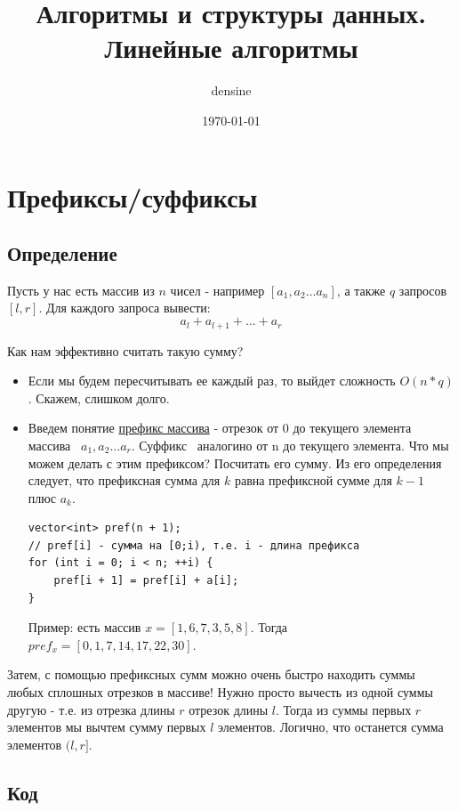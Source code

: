 \documentclass[a4paper,12pt]{article}
\title{Алгоритмы и структуры данных. Линейные алгоритмы}
\author{densine}
\date{\today}
\begin{document}
\maketitle
\tableofcontents

\section{Префиксы/суффиксы}

\subsection{Определение}

Пусть у нас есть массив из $n$ чисел - например $[a_1, a_2 \dots a_n]$, а также
$q$ запросов $[l, r]$. Для каждого запроса вывести:
\[
	a_l + a_{l+1} + \dots + a_r
\]

Как нам эффективно считать такую сумму?

\begin{itemize}
	\item Если мы будем пересчитывать ее каждый раз, то выйдет сложность $O(n * q)$.
	      Скажем, слишком долго.
	\item Введем понятие \uline{префикс массива} - отрезок от 0 до текущего элемента массива
	      \textendash\ $a_1, a_2 \dots a_r$. Суффикс \textendash\ аналогино от n до текущего элемента.
	      Что мы можем делать с этим префиксом? Посчитать его сумму.
	      Из его определения следует, что префиксная сумма для $k$ равна префиксной
	      сумме для $k - 1$ плюс $a_k$.
	      \begin{verbatim}
vector<int> pref(n + 1);
// pref[i] - сумма на [0;i), т.е. i - длина префикса
for (int i = 0; i < n; ++i) {
    pref[i + 1] = pref[i] + a[i];
}
          \end{verbatim}
	      Пример: есть массив $x = [1, 6, 7, 3, 5, 8]$.
	      Тогда $pref_x = [0, 1, 7, 14, 17, 22, 30]$.
\end{itemize}

Затем, с помощью префиксных сумм можно очень быстро находить суммы любых
сплошных отрезков в массиве! Нужно просто вычесть из одной суммы другую
- т.е. из отрезка длины $r$ отрезок длины $l$. Тогда из суммы первых
$r$ элементов мы вычтем сумму первых $l$ элементов. Логично, что
останется сумма элементов $(l, r]$.

\subsection{Код}
\end{document}

